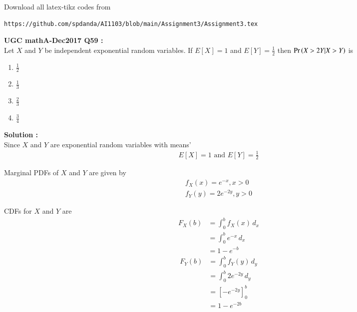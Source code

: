 \documentclass[journal,12pt,twocolumn]{IEEEtran}
\begin{document}
\maketitle
\newpage
\bigskip
\renewcommand{\thefigure}{\theenumi}
\renewcommand{\thetable}{\theenumi}
Download all latex-tikz codes from 
%
\begin{lstlisting}
https://github.com/spdanda/AI1103/blob/main/Assignment3/Assignment3.tex
\end{lstlisting}
\large\textbf{UGC mathA-Dec2017 Q59 :}\\
Let $X$ and $Y$ be independent exponential random variables. If $E[X]=1$ and $E[Y]=\frac{1}{2}$ then $\Pr\left(X>2Y|X>Y\right)$ is
\begin{multicols}{2}
    \begin{enumerate}[label=\arabic*.]
        \item \Large$\frac{1}{2}$ \\
        \item $\frac{1}{3}$
        \item $\frac{2}{3}$ \\
        \item $\frac{3}{4}$
    \end{enumerate}
\end{multicols}
\textbf{Solution :}\\
Since $X$ and $Y$ are exponential random variables with means'
\begin{align}
    E[X] = 1 \text{ and } E[Y] = \frac{1}{2}
\end{align}

Marginal PDFs of $X$ and $Y$  are given by
\begin{align}
    f_X(x)= e^{-x} , x>0 \\
    f_Y(y) = 2e^{-2y} , y>0
\end{align}

CDFs for $X$ and $Y$ are
\begin{align}
    F_X(b) &= \int_0^b f_X(x)\,d_x\\
           &= \int_0^b  e^{-x}\,d_x\\
           &= 1-e^{-b}
\end{align}
\begin{align}
    F_Y(b) &= \int_0^b f_Y(y)\,d_y\\
           &= \int_0^b 2e^{-2y}\,d_y\\
           &= \left[-e^{-2y}\right]_0^b\\
           &= 1-e^{-2b}
\end{align}
\end{document}
